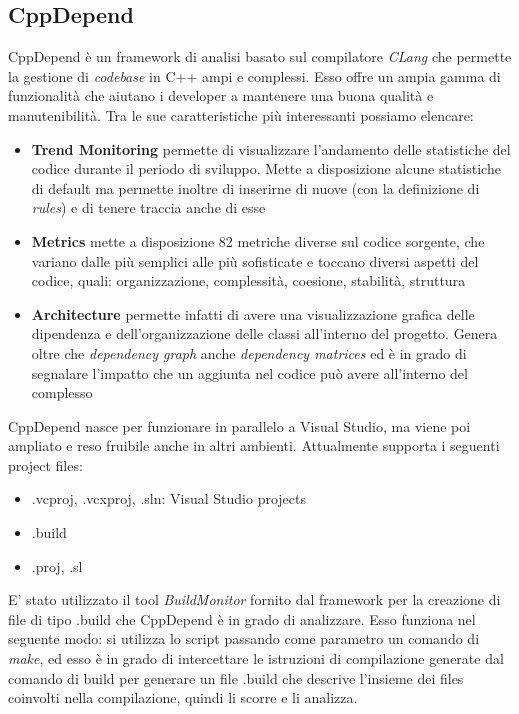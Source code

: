 {\subsection{CppDepend}
CppDepend è un framework di analisi basato sul compilatore \textit{CLang} che permette la gestione di \textit{codebase} in C++ ampi e complessi. Esso offre un ampia gamma di funzionalità che aiutano i developer a mantenere una buona qualità e manutenibilità. Tra le sue caratteristiche più interessanti possiamo elencare:
\begin{itemize}
	\item \textbf{Trend Monitoring} permette di visualizzare l'andamento delle statistiche del codice durante il periodo di sviluppo. Mette a disposizione alcune statistiche di default ma permette inoltre di inserirne di nuove (con la definizione di \textit{rules}) e di tenere traccia anche di esse
	\item \textbf{Metrics} mette a disposizione 82 metriche diverse sul codice sorgente, che variano dalle più semplici alle più sofisticate e toccano diversi aspetti del codice, quali: organizzazione, complessità, coesione, stabilità, struttura
	\item \textbf{Architecture} permette infatti di avere una visualizzazione grafica delle dipendenza e dell'organizzazione delle classi all'interno del progetto. Genera oltre che \textit{dependency graph} anche \textit{dependency matrices} ed è in grado di segnalare l'impatto che un aggiunta nel codice può avere all'interno del complesso
\end{itemize}
CppDepend nasce per funzionare in parallelo a Visual Studio, ma viene poi ampliato e reso fruibile anche in altri ambienti. Attualmente supporta i seguenti project files:
\begin{itemize}
\item .vcproj, .vcxproj, .sln: Visual Studio projects
\item .build
\item .proj, .sl
\end{itemize}
E' stato utilizzato il tool \textit{BuildMonitor} fornito dal framework per la creazione di file di tipo .build che CppDepend è in grado di analizzare. Esso funziona nel seguente modo: si utilizza lo script passando come parametro un comando di \textit{make}, ed esso è in grado di intercettare le istruzioni di compilazione generate dal comando di build per generare un file .build che descrive l'insieme dei files coinvolti nella compilazione, quindi li scorre e li analizza.\\ \\
}
